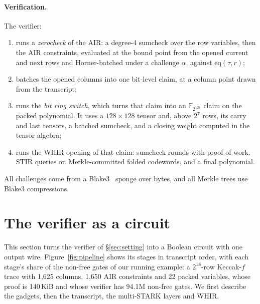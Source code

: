 \documentclass[11pt]{article}
\newcommand{\F}{\mathbb{F}_{2^{128}}}
\begin{document}
\paragraph{Verification.} The verifier:
\begin{enumerate}
  \item runs a \emph{zerocheck} of the AIR: a degree-4 sumcheck over the row
    variables, then the AIR constraints, evaluated at the bound point from the
    opened current and next rows and Horner-batched under a challenge $\alpha$,
    against $\mathrm{eq}(\tau,r)$;
  \item batches the opened columns into one bit-level claim, at a column point
    drawn from the transcript;
  \item runs the \emph{bit ring switch}, which turns that claim into an $\F$
    claim on the packed polynomial. It uses a $128\times128$ tensor and, above
    $2^7$ rows, its carry and last tensors, a batched sumcheck, and a closing
    weight computed in the tensor algebra;
  \item runs the WHIR opening of that claim: sumcheck rounds with proof of work,
    STIR queries on Merkle-committed folded codewords, and a final polynomial.
\end{enumerate}
All challenges come from a Blake3~\cite{blake3spec} sponge over bytes, and all
Merkle trees use Blake3 compressions.

\section{The verifier as a circuit}\label{sec:construction}

This section turns the verifier of \S\ref{sec:setting} into a Boolean circuit
with one output wire. Figure~\ref{fig:pipeline} shows its stages in transcript
order, with each stage's share of the non-free gates of our running example: a
$2^{18}$-row Keccak-$f$ trace with 1{,}625 columns, 1{,}650 AIR constraints and
22 packed variables, whose proof is 140\,KiB and whose verifier has 94.1M
non-free gates. We first describe the gadgets, then the transcript, the
multi-STARK layers and WHIR.
\end{document}
